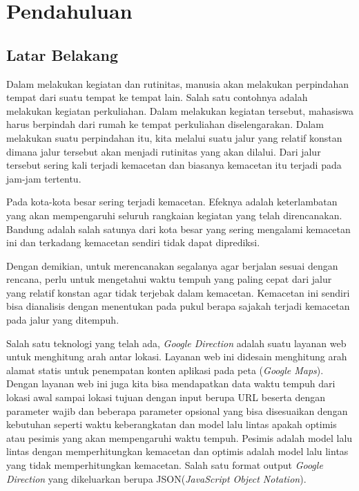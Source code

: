 \chapter{Pendahuluan}
\label{chap:intro}
   
\section{Latar Belakang}
\label{sec:label}

Dalam melakukan kegiatan dan rutinitas, manusia akan melakukan perpindahan tempat dari suatu tempat ke tempat lain. Salah satu contohnya adalah melakukan kegiatan perkuliahan. Dalam melakukan kegiatan tersebut, mahasiswa harus berpindah dari rumah ke tempat perkuliahan diselengarakan. Dalam melakukan suatu perpindahan itu, kita melalui suatu jalur yang relatif konstan dimana jalur tersebut akan menjadi rutinitas yang akan dilalui. Dari jalur tersebut sering kali terjadi kemacetan dan biasanya kemacetan itu terjadi pada jam-jam tertentu. 

Pada kota-kota besar sering terjadi kemacetan. Efeknya adalah keterlambatan yang akan mempengaruhi seluruh rangkaian kegiatan yang telah direncanakan. Bandung adalah salah satunya dari kota besar yang sering mengalami kemacetan ini dan terkadang kemacetan sendiri tidak dapat diprediksi.

Dengan demikian, untuk merencanakan segalanya agar berjalan sesuai dengan rencana, perlu untuk mengetahui waktu tempuh yang paling cepat dari jalur yang relatif konstan agar tidak terjebak dalam kemacetan. Kemacetan ini sendiri bisa dianalisis dengan menentukan pada pukul berapa sajakah terjadi kemacetan pada jalur yang ditempuh.

Salah satu teknologi yang telah ada, \textit{Google Direction} adalah suatu layanan web untuk menghitung arah antar lokasi. Layanan web ini didesain menghitung arah alamat statis untuk penempatan konten aplikasi pada peta (\textit{Google Maps}). Dengan layanan web ini juga kita bisa mendapatkan data waktu tempuh dari lokasi awal sampai lokasi tujuan dengan input berupa URL beserta dengan parameter wajib dan beberapa parameter opsional yang bisa disesuaikan dengan kebutuhan seperti waktu keberangkatan dan model lalu lintas apakah optimis atau pesimis yang akan mempengaruhi waktu tempuh. Pesimis adalah model lalu lintas dengan memperhitungkan kemacetan dan optimis adalah model lalu lintas yang tidak memperhitungkan kemacetan. Salah satu format output \textit{Google Direction} yang dikeluarkan berupa JSON(\textit{JavaScript Object Notation}).

